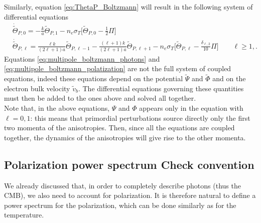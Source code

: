 Similarly, equation \eqref{eq:ThetaP_Boltzmann} will result in the following system of differential equations
\begin{subequations}\label{eq:multipole_boltzmann_polatization}
    \begin{align}
           &\dot{\tilde{\Theta}}_{P,0}=-\frac{k}{a}\tilde{\Theta}_{P,1}-n_e\sigma_T\bigg[\tilde\Theta_{P,0}-\frac{1}{2}\Pi\bigg]\label{eq:multipole_boltzmann_polatization_0}\\
            &\dot{\tilde{\Theta}}_{P,\ell}=\frac{\ell k}{(2\ell+1)a}\tilde\Theta_{P,\ell-1}-\frac{(\ell+1)k}{(2\ell+1)a}\tilde\Theta_{P,\ell+1}-n_e\sigma_T\bigg[\tilde\Theta_{P,\ell}-\frac{\delta_{\ell,2}}{10}\Pi\bigg]\qquad \ell\geq 1,\label{eq:multipole_boltzmann_polatization_2}.
        \end{align}
\end{subequations}  
Equations \eqref{eq:multipole_boltzmann_photons} and \eqref{eq:multipole_boltzmann_polatization} are not the full system of coupled equations, indeed these equations depend on the potential $\tilde\Psi$ and $\tilde\Phi$ and on the electron bulk velocity $\tilde v_b$. The differential equations governing these quantities must then be added to the ones above and solved all together.\\
Note that, in the above equations, $\Psi$ and $\Phi$ appears only in the equation with $\ell=0,1$: this means that primordial perturbations source directly only the first two momenta of the anisotropies. Then, since all the equations are coupled together, the dynamics of the anisotropies will give rise to the other momenta.
\subsection{Polarization power spectrum Check convention}\label{sec:PolarizationPowerSpectrum}
We already discussed that, in order to completely describe photons (thus the CMB), we also need to account for polarization. It is therefore natural to define a power spectrum for the polarization, which can be done similarly as for the temperature.

